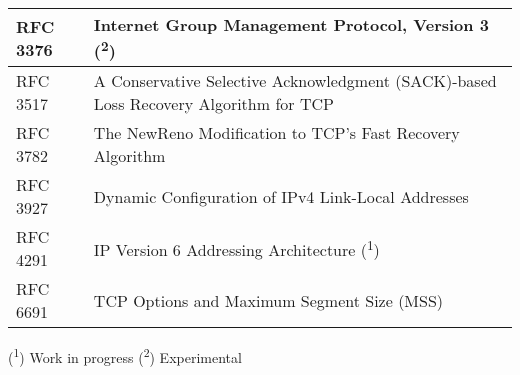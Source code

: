 \begin{longtable}{ | l | p{15cm} | }
RFC 3376 &
Internet Group Management Protocol, Version 3 (\textsuperscript{2}) \\ \hline

RFC 3517 &
A Conservative Selective Acknowledgment (SACK)-based Loss Recovery Algorithm for TCP \\ \hline

RFC 3782 &
The NewReno Modification to TCP's Fast Recovery Algorithm \\ \hline

RFC 3927 &
Dynamic Configuration of IPv4 Link-Local Addresses \\ \hline

RFC 4291 &
IP Version 6 Addressing Architecture (\textsuperscript{1}) \\ \hline

RFC 6691 &
TCP Options and Maximum Segment Size (MSS) \\ \hline

\end{longtable}

(\textsuperscript{1}) Work in progress
(\textsuperscript{2}) Experimental
